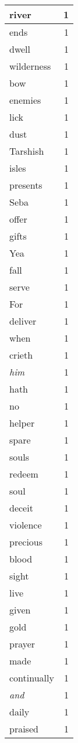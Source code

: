 \begin{center}
\begin{longtable}{l|r}
river & 1\\ \hline 
ends & 1\\ \hline 
dwell & 1\\ \hline 
wilderness & 1\\ \hline 
bow & 1\\ \hline 
enemies & 1\\ \hline 
lick & 1\\ \hline 
dust & 1\\ \hline 
Tarshish & 1\\ \hline 
isles & 1\\ \hline 
presents & 1\\ \hline 
Seba & 1\\ \hline 
offer & 1\\ \hline 
gifts & 1\\ \hline 
Yea & 1\\ \hline 
fall & 1\\ \hline 
serve & 1\\ \hline 
For & 1\\ \hline 
deliver & 1\\ \hline 
when & 1\\ \hline 
crieth & 1\\ \hline 
\emph{him} & 1\\ \hline 
hath & 1\\ \hline 
no & 1\\ \hline 
helper & 1\\ \hline 
spare & 1\\ \hline 
souls & 1\\ \hline 
redeem & 1\\ \hline 
soul & 1\\ \hline 
deceit & 1\\ \hline 
violence & 1\\ \hline 
precious & 1\\ \hline 
blood & 1\\ \hline 
sight & 1\\ \hline 
live & 1\\ \hline 
given & 1\\ \hline 
gold & 1\\ \hline 
prayer & 1\\ \hline 
made & 1\\ \hline 
continually & 1\\ \hline 
\emph{and} & 1\\ \hline 
daily & 1\\ \hline 
praised & 1\\ \hline 

\end{longtable}
\end{center}
